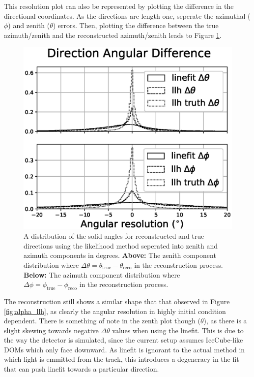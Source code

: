 This resolution plot can also be represented by plotting the difference in the directional coordinates. As the directions are length one, seperate the azimuthal ($\phi$) and zenith ($\theta$) errors. Then, plotting the difference between the true azimuth/zenith and the reconstructed azimuth/zenith leads to Figure \ref{fig:alpha_llh_sep}. 

\begin{figure}[H]
  \centering
  \includegraphics[width=12cm]{./Figures/reco_plots/angular_diff_dir.eps}
  \caption{A distribution of the solid angles for reconstructed and true directions using the likelihood method seperated into zenith and azimuth components in degrees. \textbf{Above:} The zenith component distribution where $\Delta\theta = \theta_{\text{true}} - \theta_{\text{reco}}$ in the reconstruction process. \textbf{Below:} The azimuth component distribution where $\Delta\phi = \phi_{\text{true}} - \phi_{\text{reco}}$ in the reconstruction process.}
  \label{fig:alpha_llh_sep}
\end{figure}

The reconstruction still shows a similar shape that that observed in Figure \ref{fig:alpha_llh}, as clearly the angular resolution in highly initial condition dependent. There is something of note in the zenth plot though ($\theta$), as there is a slight skewing towards negative $\Delta\theta$ values when using the linefit. This is due to the way the detector is simulated, since the current setup assumes IceCube-like DOMs which only face downward. As linefit is ignorant to the actual method in which light is emmitted from the track, this introduces a degeneracy in the fit that can push linefit towards a particular direction.


